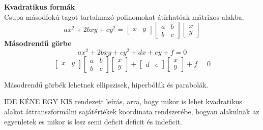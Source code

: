 \documentclass[a4paper, 12pt]{scrartcl}
\begin{document}
\begin{blueBox}
  \textbf{Kvadratikus formák}\\
  Csupa másodfokú tagot tartalmazó polinomokat átírhatóak mátrixos alakba.
  \[
    ax^2 + 2bxy + cy^2 = \begin{bmatrix}
      x & y
    \end{bmatrix} \begin{bmatrix}
      a & b \\
      b & c
    \end{bmatrix} \begin{bmatrix}
      x \\
      y
    \end{bmatrix}
  \]
  \textbf{Másodrendű görbe}
  \[
    ax^2 + 2bxy + cy^2 + dx + ey + f = 0
  \]
  \[
    \begin{bmatrix}
      x & y
    \end{bmatrix} \begin{bmatrix}
      a & b \\
      b & c
    \end{bmatrix} \begin{bmatrix}
      x \\
      y
    \end{bmatrix} + \begin{bmatrix}
      d & e
    \end{bmatrix} \begin{bmatrix}
      x \\
      y
    \end{bmatrix} + f = 0
  \]

  Másodrendű görbék lehetnek ellipszisek, hiperbólák és parabolák.

  IDE KÉNE EGY KIS rendezett leírás, arra, hogy mikor is lehet kvadratikus alakot áttranszformálni sajátértékek koordinata rendszerébe, hogyan alakulnak az egyenletek es mikor is lesz semi deficit deficit és indeficit.
\end{blueBox}

\clearpage
\end{document}
